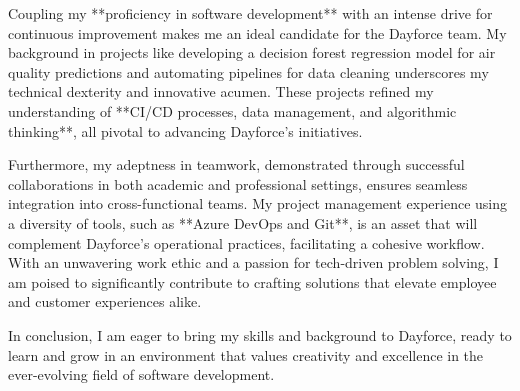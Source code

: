 \documentclass[11pt, a4paper]{awesome-cv}
\begin{document}
\begin{cvletter}
Coupling my **proficiency in software development** with an intense drive for continuous improvement makes me an ideal candidate for the Dayforce team. My background in projects like developing a decision forest regression model for air quality predictions and automating pipelines for data cleaning underscores my technical dexterity and innovative acumen. These projects refined my understanding of **CI/CD processes, data management, and algorithmic thinking**, all pivotal to advancing Dayforce's initiatives.

Furthermore, my adeptness in teamwork, demonstrated through successful collaborations in both academic and professional settings, ensures seamless integration into cross-functional teams. My project management experience using a diversity of tools, such as **Azure DevOps and Git**, is an asset that will complement Dayforce's operational practices, facilitating a cohesive workflow. With an unwavering work ethic and a passion for tech-driven problem solving, I am poised to significantly contribute to crafting solutions that elevate employee and customer experiences alike. 

In conclusion, I am eager to bring my skills and background to Dayforce, ready to learn and grow in an environment that values creativity and excellence in the ever-evolving field of software development.

\end{cvletter}


\makeletterclosing
\end{document}
